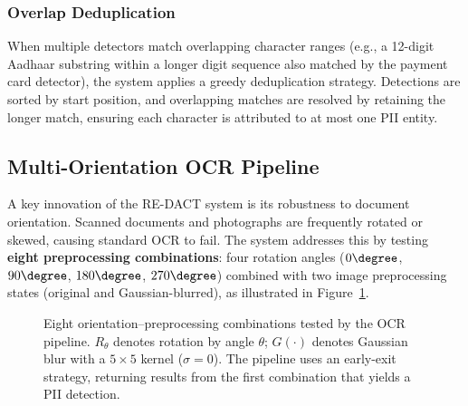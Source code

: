 \documentclass[conference]{IEEEtran}
\begin{document}
\subsubsection{Overlap Deduplication}
When multiple detectors match overlapping character ranges (e.g., a 12-digit Aadhaar substring within a longer digit sequence also matched by the payment card detector), the system applies a greedy deduplication strategy. Detections are sorted by start position, and overlapping matches are resolved by retaining the longer match, ensuring each character is attributed to at most one PII entity.

\subsection{Multi-Orientation OCR Pipeline}
A key innovation of the RE-DACT system is its robustness to document orientation. Scanned documents and photographs are frequently rotated or skewed, causing standard OCR to fail. The system addresses this by testing \textbf{eight preprocessing combinations}: four rotation angles ($0\degree$, $90\degree$, $180\degree$, $270\degree$) combined with two image preprocessing states (original and Gaussian-blurred), as illustrated in Figure~\ref{fig:orientations}.

\begin{figure}[htbp]
\centering
{}
\caption{Eight orientation--preprocessing combinations tested by the OCR pipeline. $R_\theta$ denotes rotation by angle $\theta$; $G(\cdot)$ denotes Gaussian blur with a $5\times5$ kernel ($\sigma=0$). The pipeline uses an early-exit strategy, returning results from the first combination that yields a PII detection.}
\label{fig:orientations}
\end{figure}
\end{document}
